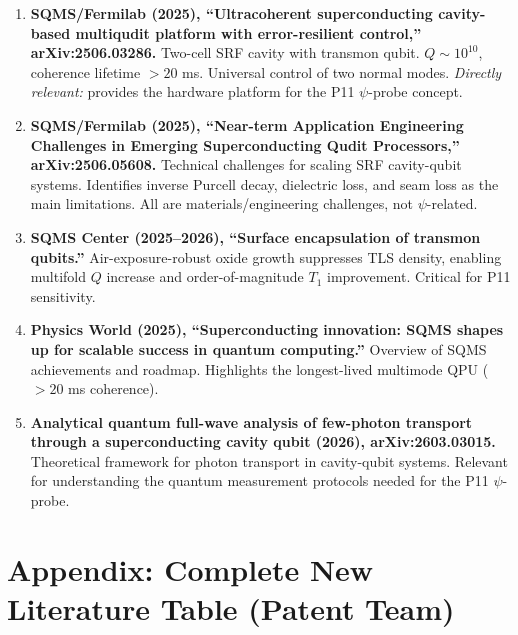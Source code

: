 \documentclass[11pt]{article}
\begin{document}
\begin{tcolorbox}[colback=green!5!white, colframe=green!50!black,
  title=\textbf{Agent 8: NEW LITERATURE REVIEWED}]

\begin{enumerate}

\item \textbf{SQMS/Fermilab (2025), ``Ultracoherent superconducting
  cavity-based multiqudit platform with error-resilient control,''
  arXiv:2506.03286.}
  Two-cell SRF cavity with transmon qubit. $Q \sim 10^{10}$,
  coherence lifetime $> 20$ ms. Universal control of two normal modes.
  \emph{Directly relevant:} provides the hardware platform for the
  P11 $\psi$-probe concept.

\item \textbf{SQMS/Fermilab (2025), ``Near-term Application
  Engineering Challenges in Emerging Superconducting Qudit Processors,''
  arXiv:2506.05608.}
  Technical challenges for scaling SRF cavity-qubit systems.
  Identifies inverse Purcell decay, dielectric loss, and seam loss
  as the main limitations. All are materials/engineering challenges,
  not $\psi$-related.

\item \textbf{SQMS Center (2025--2026), ``Surface encapsulation of
  transmon qubits.''} Air-exposure-robust oxide growth suppresses
  TLS density, enabling multifold $Q$ increase and order-of-magnitude
  $T_1$ improvement. Critical for P11 sensitivity.

\item \textbf{Physics World (2025), ``Superconducting innovation:
  SQMS shapes up for scalable success in quantum computing.''}
  Overview of SQMS achievements and roadmap. Highlights the
  longest-lived multimode QPU ($> 20$ ms coherence).

\item \textbf{Analytical quantum full-wave analysis of few-photon
  transport through a superconducting cavity qubit (2026),
  arXiv:2603.03015.}
  Theoretical framework for photon transport in cavity-qubit systems.
  Relevant for understanding the quantum measurement protocols
  needed for the P11 $\psi$-probe.

\end{enumerate}
\end{tcolorbox}


\section{Appendix: Complete New Literature Table (Patent Team)}
\end{document}
